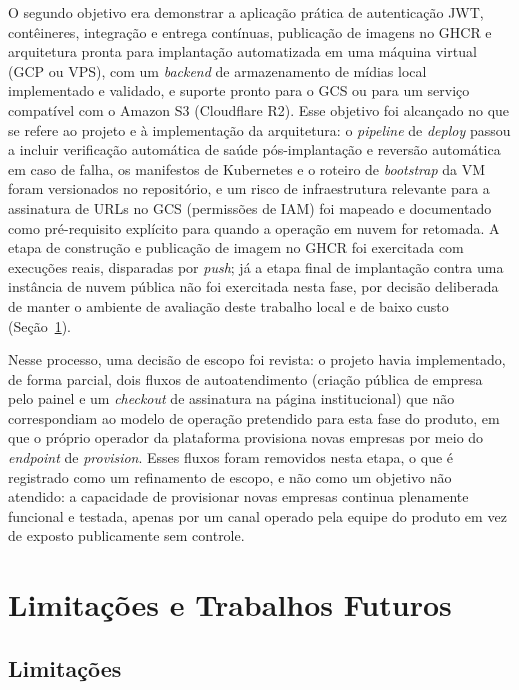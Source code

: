 O segundo objetivo era demonstrar a aplicação prática de autenticação JWT, contêineres, integração e entrega contínuas, publicação de imagens no GHCR e arquitetura pronta para implantação automatizada em uma máquina virtual (GCP ou VPS), com um \textit{backend} de armazenamento de mídias local implementado e validado, e suporte pronto para o GCS ou para um serviço compatível com o Amazon S3 (Cloudflare R2). Esse objetivo foi alcançado no que se refere ao projeto e à implementação da arquitetura: o \textit{pipeline} de \textit{deploy} passou a incluir verificação automática de saúde pós-implantação e reversão automática em caso de falha, os manifestos de Kubernetes e o roteiro de \textit{bootstrap} da VM foram versionados no repositório, e um risco de infraestrutura relevante para a assinatura de URLs no GCS (permissões de IAM) foi mapeado e documentado como pré-requisito explícito para quando a operação em nuvem for retomada. A etapa de construção e publicação de imagem no GHCR foi exercitada com execuções reais, disparadas por \textit{push}; já a etapa final de implantação contra uma instância de nuvem pública não foi exercitada nesta fase, por decisão deliberada de manter o ambiente de avaliação deste trabalho local e de baixo custo (Seção~\ref{sec:limitacoes}).

Nesse processo, uma decisão de escopo foi revista: o projeto havia implementado, de forma parcial, dois fluxos de autoatendimento (criação pública de empresa pelo painel e um \textit{checkout} de assinatura na página institucional) que não correspondiam ao modelo de operação pretendido para esta fase do produto, em que o próprio operador da plataforma provisiona novas empresas por meio do \textit{endpoint} de \textit{provision}. Esses fluxos foram removidos nesta etapa, o que é registrado como um refinamento de escopo, e não como um objetivo não atendido: a capacidade de provisionar novas empresas continua plenamente funcional e testada, apenas por um canal operado pela equipe do produto em vez de exposto publicamente sem controle.

\section{Limitações e Trabalhos Futuros}
\label{sec:limitacoes}

\subsection{Limitações}

